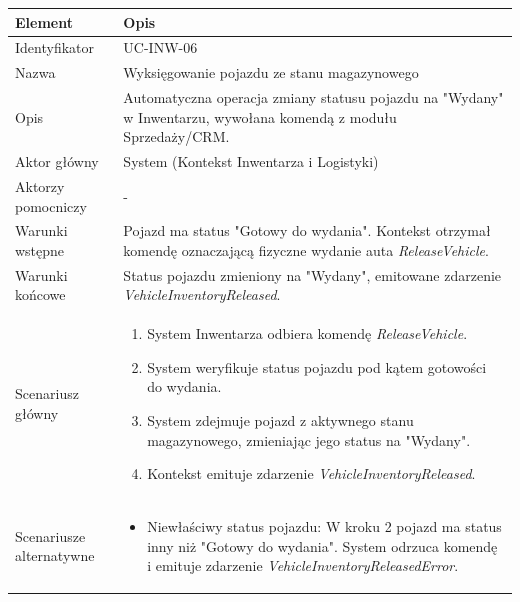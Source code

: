 \begin{longtable}{|p{4cm}|p{11cm}|}
\hline
\textbf{Element} & \textbf{Opis} \\
\hline

Identyfikator & UC-INW-06 \\
\hline

Nazwa & Wyksięgowanie pojazdu ze stanu magazynowego \\
\hline

Opis & 
Automatyczna operacja zmiany statusu pojazdu na "Wydany" w Inwentarzu, wywołana komendą z modułu Sprzedaży/CRM. \\
\hline

Aktor główny & System (Kontekst Inwentarza i Logistyki) \\
\hline

Aktorzy pomocniczy & - \\
\hline

Warunki wstępne & 
Pojazd ma status "Gotowy do wydania". Kontekst otrzymał komendę oznaczającą fizyczne wydanie auta \textit{ReleaseVehicle}. \\
\hline

Warunki końcowe & 
Status pojazdu zmieniony na "Wydany", emitowane zdarzenie \textit{VehicleInventoryReleased}. \\
\hline

Scenariusz główny & 
\begin{enumerate}
    \item System Inwentarza odbiera komendę \textit{ReleaseVehicle}.
    \item System weryfikuje status pojazdu pod kątem gotowości do wydania.
    \item System zdejmuje pojazd z aktywnego stanu magazynowego, zmieniając jego status na "Wydany".
    \item Kontekst emituje zdarzenie \textit{VehicleInventoryReleased}.
\end{enumerate} \\
\hline

Scenariusze alternatywne & 
\begin{itemize}
    \item [A1] Niewłaściwy status pojazdu: W kroku 2 pojazd ma status inny niż "Gotowy do wydania". System odrzuca komendę i emituje zdarzenie \textit{VehicleInventoryReleasedError}.
\end{itemize} \\
\hline
\end{longtable}